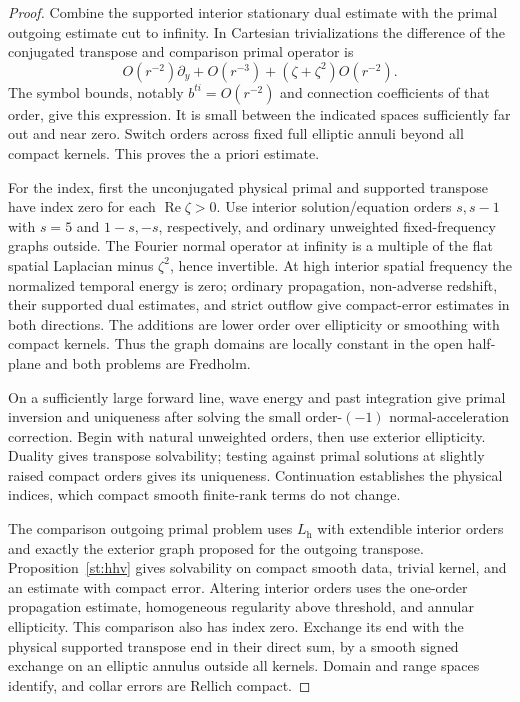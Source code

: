 \begin{proof}
Combine the supported interior stationary dual estimate with the
primal outgoing estimate cut to infinity.  In Cartesian
trivializations the difference of the conjugated transpose and
comparison primal operator is
\[
 O(r^{-2})\partial_y+O(r^{-3})
                     +(\zeta+\zeta^2)O(r^{-2}).
\]
The symbol bounds, notably $b^{ti}=O(r^{-2})$ and connection
coefficients of that order, give this expression.  It is small
between the indicated spaces sufficiently far out and near zero.
Switch orders across fixed full elliptic annuli beyond all
compact kernels.  This proves the a priori estimate.

For the index, first the
unconjugated physical primal and supported transpose have index
zero for each $\operatorname{Re}\zeta>0$.  Use interior
solution/equation orders $s,s-1$ with $s=5$ and $1-s,-s$,
respectively, and ordinary unweighted fixed-frequency graphs
outside.  The Fourier normal operator at infinity is a multiple
of the flat spatial Laplacian minus $\zeta^2$, hence invertible.
At high interior spatial frequency the normalized temporal
energy is zero; ordinary propagation, non-adverse redshift, their
supported dual estimates, and strict outflow give compact-error
estimates in both directions.  The additions are lower order over
ellipticity or smoothing with compact kernels.  Thus the graph
domains are locally constant in the open half-plane and both
problems are Fredholm.

On a sufficiently large forward line, wave energy and past
integration give primal inversion and uniqueness after solving
the small order-$(-1)$ normal-acceleration correction.  Begin
with natural unweighted orders, then use exterior ellipticity.
Duality gives transpose solvability; testing against primal
solutions at slightly raised compact orders gives its uniqueness.
Continuation establishes the physical indices, which compact
smooth finite-rank terms do not change.

The comparison outgoing primal problem uses $L_{\mathrm h}$ with
extendible interior orders and exactly the exterior graph proposed
for the outgoing transpose.  Proposition~\ref{st:hhv} gives
solvability on compact smooth data, trivial kernel, and an estimate
with compact error.  Altering interior orders uses the one-order
propagation estimate, homogeneous regularity above threshold,
and annular ellipticity.  This comparison also has index zero.
Exchange its end with the physical supported transpose end in
their direct sum, by a smooth signed exchange on an elliptic
annulus outside all kernels.  Domain and range spaces identify,
and collar errors are Rellich compact.


\end{proof}
